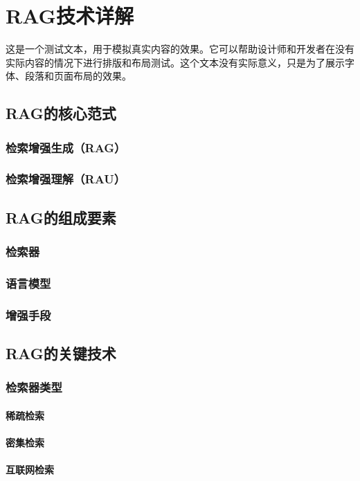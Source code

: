 \chapter{RAG技术详解}
这是一个测试文本，用于模拟真实内容的效果。它可以帮助设计师和开发者在没有实际内容的情况下进行排版和布局测试。这个文本没有实际意义，只是为了展示字体、段落和页面布局的效果。

\section{RAG的核心范式}
\subsection{检索增强生成（RAG）}
\subsection{检索增强理解（RAU）}

\section{RAG的组成要素}
\subsection{检索器}
\subsection{语言模型}
\subsection{增强手段}

\section{RAG的关键技术}
\subsection{检索器类型}
\subsubsection{稀疏检索}
\subsubsection{密集检索}
\subsubsection{互联网检索}
